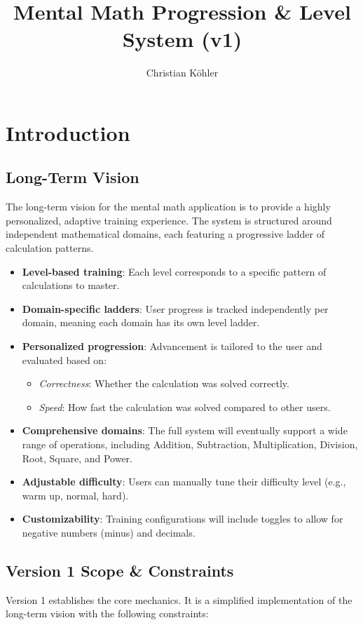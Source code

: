\documentclass[11pt]{article}
\title{Mental Math Progression \& Level System (v1)}
\author{Christian Köhler}
\date{}
\begin{document}
\maketitle

\section{Introduction}

\subsection{Long-Term Vision}
The long-term vision for the mental math application is to provide a highly personalized, adaptive training experience. The system is structured around independent mathematical domains, each featuring a progressive ladder of calculation patterns.

\begin{itemize}[leftmargin=*]
    \item \textbf{Level-based training}: Each level corresponds to a specific pattern of calculations to master.
    \item \textbf{Domain-specific ladders}: User progress is tracked independently per domain, meaning each domain has its own level ladder.
    \item \textbf{Personalized progression}: Advancement is tailored to the user and evaluated based on:
    \begin{itemize}
        \item \textit{Correctness}: Whether the calculation was solved correctly.
        \item \textit{Speed}: How fast the calculation was solved compared to other users.
    \end{itemize}
    \item \textbf{Comprehensive domains}: The full system will eventually support a wide range of operations, including Addition, Subtraction, Multiplication, Division, Root, Square, and Power.
    \item \textbf{Adjustable difficulty}: Users can manually tune their difficulty level (e.g., warm up, normal, hard).
    \item \textbf{Customizability}: Training configurations will include toggles to allow for negative numbers (minus) and decimals.
\end{itemize}

\subsection{Version 1 Scope \& Constraints}
Version 1 establishes the core mechanics. It is a simplified implementation of the long-term vision with the following constraints:
\end{document}

